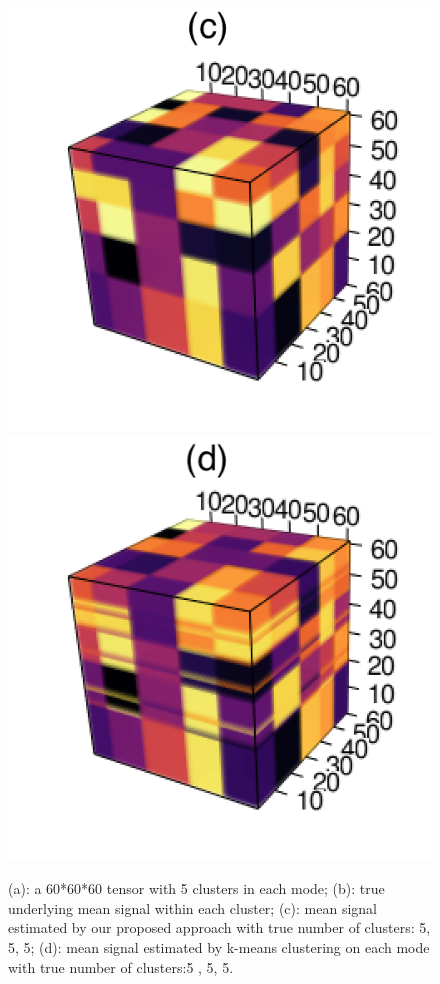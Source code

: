 \documentclass{article}
\begin{document}
\begin{figure}[!h]
	\includegraphics[scale=0.35]{figures/figure1/output.png}
	\includegraphics[scale=0.35]{figures/figure1/k_means.png}
	\caption{(a): a 60*60*60 tensor with 5 clusters in each mode; (b): true underlying mean signal within each cluster; (c): mean signal estimated by our proposed approach with true number of clusters: 5, 5, 5; (d): mean signal estimated by k-means clustering on each mode with true number of clusters:5 , 5, 5.}
	\label{fig1}
\end{figure}
\end{document}
